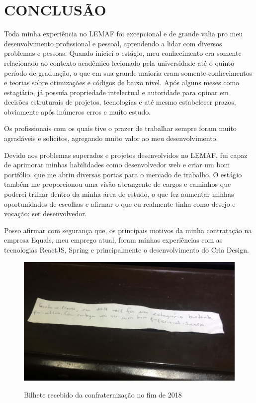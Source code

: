 \chapter{CONCLUSÃO}
\label{cap:conclusao}

Toda minha experiência no LEMAF foi excepcional e de grande valia pro meu desenvolvimento profissional e pessoal, aprendendo a lidar com diversos problemas e pessoas.
Quando iniciei o estágio, meu conhecimento era somente relacionado ao contexto acadêmico lecionado pela universidade até o quinto período de graduação, o que em sua grande maioria eram somente conhecimentos e teorias sobre otimizações e códigos de baixo nível.
Após alguns meses como estagiário, já possuía propriedade intelectual e autoridade para opinar em decisões estruturais de projetos, tecnologias e até mesmo estabelecer prazos, obviamente após inúmeros erros e muito estudo.
 
Os profissionais com os quais tive o prazer de trabalhar sempre foram muito agradáveis e solícitos, agregando muito valor ao meu desenvolvimento.

Devido aos problemas superados e projetos desenvolvidos no LEMAF, fui capaz de aprimorar minhas habilidades como desenvolvedor web e criar um bom portfólio, que me abriu diversas portas para o mercado de trabalho.
O estágio também me proporcionou uma visão abrangente de cargos e caminhos que poderei trilhar dentro da minha área de estudo, o que fez aumentar minhas oportunidades de escolhas e afirmar o que eu realmente tinha como desejo e vocação: ser desenvolvedor.

Posso afirmar com segurança que, os principais motivos da minha contratação na empresa Equals, meu emprego atual, foram minhas experiências com as tecnologias ReactJS, Spring e principalmente o desenvolvimento do Cria Design.

\begin{figure}[H]
\centering
\caption{Bilhete recebido da confraternização no fim de 2018} %
\includegraphics[scale=0.3]{agradecimento}\\  %
\label{fig:exemplo} %
\end{figure}

